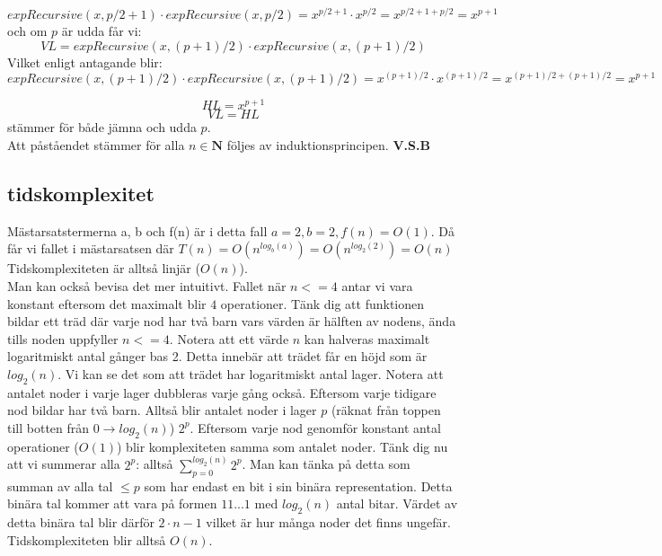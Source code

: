 \documentclass{article}
\begin{document}
\[ expRecursive(x, p/2+1)\cdot expRecursive(x, p/2) = x^{p/2+1}\cdot x^{p/2} = x^{p/2+1+p/2} = x^{p+1}\]
och om $p$ är udda får vi: \[
VL = expRecursive(x, (p+1)/2)\cdot expRecursive(x, (p+1)/2)
\]
Vilket enligt antagande blir: \\
\[
expRecursive(x, (p+1)/2)\cdot expRecursive(x, (p+1)/2) = x^{(p+1)/2}\cdot x^{(p+1)/2} = x^{(p+1)/2 + (p+1)/2} = x^{p+1}
\]

\[ HL = x^{p+1}\]
\[ VL = HL \] stämmer för både jämna och udda $p$.\\
Att påståendet stämmer för alla $n \in \mathbf{N}$ följes av induktionsprincipen.
\textbf{V.S.B}

\subsection{tidskomplexitet}
Mästarsatstermerna a, b och f(n) är i detta fall $a = 2, b=2, f(n)=O(1)$. Då får vi fallet i mästarsatsen där $T(n) = O(n^{log_b(a)}) = O(n^{log_2(2)}) = O(n)$\\
Tidskomplexiteten är alltså linjär ($O(n)$).\\

Man kan också bevisa det mer intuitivt. Fallet när $n <= 4$ antar vi vara konstant eftersom det maximalt blir $4$ operationer. Tänk dig att funktionen bildar ett träd där varje nod har två barn vars värden är hälften av nodens, ända tills noden uppfyller $n <= 4$. Notera att ett värde $n$ kan halveras maximalt logaritmiskt antal gånger bas 2. Detta innebär att trädet får en höjd som är $log_2(n)$. Vi kan se det som att trädet har logaritmiskt antal lager. Notera att antalet noder i varje lager dubbleras varje gång också. Eftersom varje tidigare nod bildar har två barn. Alltså blir antalet noder i lager $p$ (räknat från toppen till botten från $0 \longrightarrow log_2(n)$) $2^{p}$. Eftersom varje nod genomför konstant antal operationer ($O(1)$) blir komplexiteten samma som antalet noder. Tänk dig nu att vi summerar alla $2^p$: alltså $\sum_{p=0}^{log_2(n)}2^p$. Man kan tänka på detta som summan av alla tal $\leq p$ som har endast en bit i sin binära representation. Detta binära  tal kommer att vara på formen $11...1$ med $log_2(n)$ antal bitar. Värdet av detta binära tal blir därför $2\cdot n -1$ vilket är hur många noder det finns ungefär. Tidskomplexiteten blir alltså $O(n)$.
\end{document}
